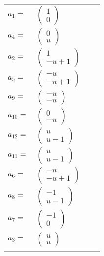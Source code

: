 \documentclass[1p]{elsarticle_modified}
\theoremstyle{definition}
\begin{document}
\begin{tabular}{m{7pt} m{180pt} m{7pt} m{180pt} }
\flushright $a_{1}=$&$\begin{pmatrix}1\\0\end{pmatrix}$ \\
\flushright $a_{4}=$&$\begin{pmatrix}0\\u\end{pmatrix}$ \\
\flushright $a_{2}=$&$\begin{pmatrix}1\\- u+1\end{pmatrix}$ \\
\flushright $a_{5}=$&$\begin{pmatrix}- u\\- u+1\end{pmatrix}$ \\
\flushright $a_{9}=$&$\begin{pmatrix}- u\\- u\end{pmatrix}$ \\
\flushright $a_{10}=$&$\begin{pmatrix}0\\- u\end{pmatrix}$ \\
\flushright $a_{12}=$&$\begin{pmatrix}u\\u-1\end{pmatrix}$ \\
\flushright $a_{11}=$&$\begin{pmatrix}u\\u-1\end{pmatrix}$ \\
\flushright $a_{6}=$&$\begin{pmatrix}- u\\- u+1\end{pmatrix}$ \\
\flushright $a_{8}=$&$\begin{pmatrix}-1\\u-1\end{pmatrix}$ \\
\flushright $a_{7}=$&$\begin{pmatrix}-1\\0\end{pmatrix}$ \\
\flushright $a_{3}=$&$\begin{pmatrix}u\\u\end{pmatrix}$\\&\end{tabular}
\end{document}
